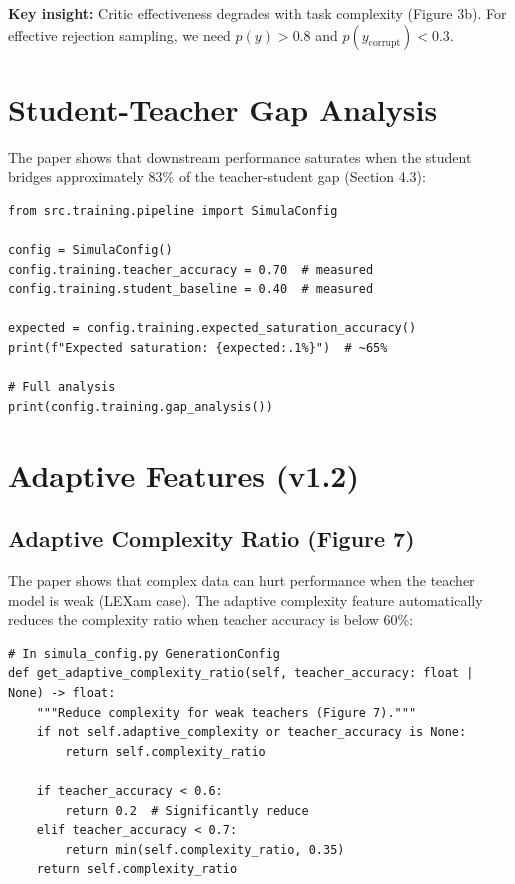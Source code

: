\textbf{Key insight:} Critic effectiveness degrades with task complexity (Figure 3b).
For effective rejection sampling, we need $p(y) > 0.8$ and $p(y_{\text{corrupt}}) < 0.3$.

\section{Student-Teacher Gap Analysis}

The paper shows that downstream performance saturates when the student bridges
approximately 83\% of the teacher-student gap (Section 4.3):

\begin{lstlisting}[language=jsonx,caption={Gap analysis}]
from src.training.pipeline import SimulaConfig

config = SimulaConfig()
config.training.teacher_accuracy = 0.70  # measured
config.training.student_baseline = 0.40  # measured

expected = config.training.expected_saturation_accuracy()
print(f"Expected saturation: {expected:.1%}")  # ~65%

# Full analysis
print(config.training.gap_analysis())
\end{lstlisting}

\section{Adaptive Features (v1.2)}

\subsection{Adaptive Complexity Ratio (Figure 7)}

The paper shows that complex data can hurt performance when the teacher model is weak
(LEXam case). The adaptive complexity feature automatically reduces the complexity
ratio when teacher accuracy is below 60\%:

\begin{lstlisting}[language=jsonx,caption={Adaptive complexity ratio}]
# In simula_config.py GenerationConfig
def get_adaptive_complexity_ratio(self, teacher_accuracy: float | None) -> float:
    """Reduce complexity for weak teachers (Figure 7)."""
    if not self.adaptive_complexity or teacher_accuracy is None:
        return self.complexity_ratio
    
    if teacher_accuracy < 0.6:
        return 0.2  # Significantly reduce
    elif teacher_accuracy < 0.7:
        return min(self.complexity_ratio, 0.35)
    return self.complexity_ratio
\end{lstlisting}

